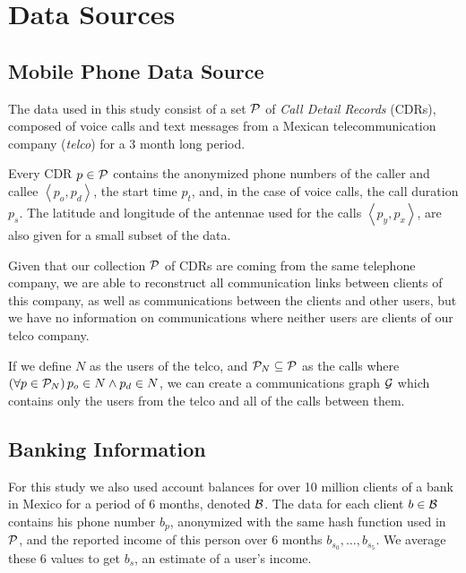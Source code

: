 \section{Data Sources} \label{data_sources}

\subsection{Mobile Phone Data Source}

The data used in this study consist of a set \( \mathcal{P} \) of \textit{Call Detail Records} (CDRs), composed of voice calls and text messages from a Mexican telecommunication company (\textit{telco}) for a 3 month long period.

Every CDR \( p \in \mathcal{P} \)  contains the anonymized phone numbers of the caller and callee \( \left< p_o, p_d \right> \), the start time \( p_t \), and, in the case of voice calls, the call duration \( p_s \). The latitude and longitude of the antennae used for the calls \( \left< p_y, p_x \right> \), are also given for a small subset of the data.

Given that our collection \( \mathcal{P} \) of CDRs are coming from the same telephone company, we are able to reconstruct all communication links between clients of this company, as well as communications between the clients and other users, but we have no information on communications where neither users are clients of our telco company.

If we define \( N \) as the users of the telco, and \( \mathcal{P}_N \subseteq \mathcal{P} \) as the calls where \( \left( \forall p \in \mathcal{P}_N \right) p_o \in N \wedge p_d \in N \), we can create a communications graph \( \mathcal{G} \) which contains only the users from the telco and all of the calls between them.


\subsection{Banking Information}

For this study we also used account balances for over 10 million clients of a bank in Mexico for a period of 6 months, denoted \( \mathcal{B} \). The data for each client \( b \in \mathcal{B} \) contains his phone number \( b_p \), anonymized with the same hash function used in \( \mathcal{P} \), and the reported income of this person over 6 months \( b_{s_0}, \ldots, b_{s_5} \). We average these 6 values to get \( b_s \), an estimate of a user's income.


